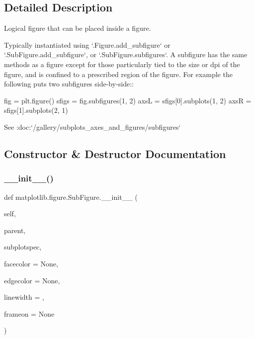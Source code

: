 \subsection{Detailed Description}
\begin{DoxyVerb}Logical figure that can be placed inside a figure.

Typically instantiated using `.Figure.add_subfigure` or
`.SubFigure.add_subfigure`, or `.SubFigure.subfigures`.  A subfigure has
the same methods as a figure except for those particularly tied to the size
or dpi of the figure, and is confined to a prescribed region of the figure.
For example the following puts two subfigures side-by-side::

    fig = plt.figure()
    sfigs = fig.subfigures(1, 2)
    axsL = sfigs[0].subplots(1, 2)
    axsR = sfigs[1].subplots(2, 1)

See :doc:`/gallery/subplots_axes_and_figures/subfigures`
\end{DoxyVerb}
 

\subsection{Constructor \& Destructor Documentation}
\mbox{\label{classmatplotlib_1_1figure_1_1SubFigure_a41a31b7d57b06a54e19f70f17904fd31}} 
\subsubsection{\texorpdfstring{\+\_\+\+\_\+init\+\_\+\+\_\+()}{\_\_init\_\_()}}
{\footnotesize\ttfamily def matplotlib.\+figure.\+Sub\+Figure.\+\_\+\+\_\+init\+\_\+\+\_\+ (\begin{DoxyParamCaption}\item[{}]{self,  }\item[{}]{parent,  }\item[{}]{subplotspec,  }\item[{}]{facecolor = {\ttfamily None},  }\item[{}]{edgecolor = {\ttfamily None},  }\item[{}]{linewidth = {},  }\item[{}]{frameon = {\ttfamily None} }\end{DoxyParamCaption})}

